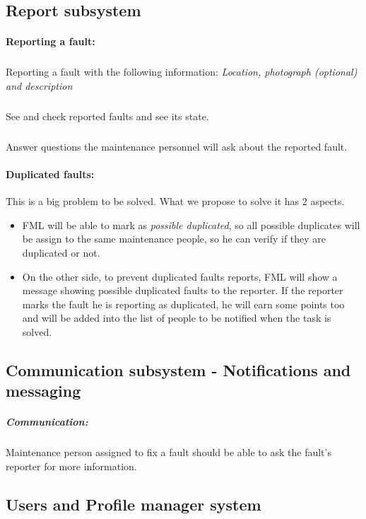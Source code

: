\subsection{Report subsystem}

\paragraph{Reporting a fault: } 


\subparagraph{} Reporting a fault with the following information: \textit{Location, photograph (optional) and description}

\subparagraph{} See and check reported faults and see its state.

\subparagraph{} Answer questions the maintenance personnel will ask about the reported fault.



\paragraph{Duplicated faults: } This is a big problem to be solved. What we propose to solve it has 2 aspects.
\begin{itemize}
\item FML will be able to mark as \textit{possible duplicated}, so all possible duplicates will be assign to the same maintenance people, so he can verify if they are duplicated or not.

\item On the other side, to prevent duplicated faults reports, FML will show a message showing possible duplicated faults to the reporter. If the reporter marks the fault he is reporting as duplicated, he will earn some points too and will be added into the list of people to be notified when the task is solved.
\end{itemize}


\subsection{Communication subsystem - Notifications and messaging}

\subparagraph{Communication: } Maintenance person assigned to fix a fault should be able to ask the fault's reporter for more information.


\subsection{Users and Profile manager system}

